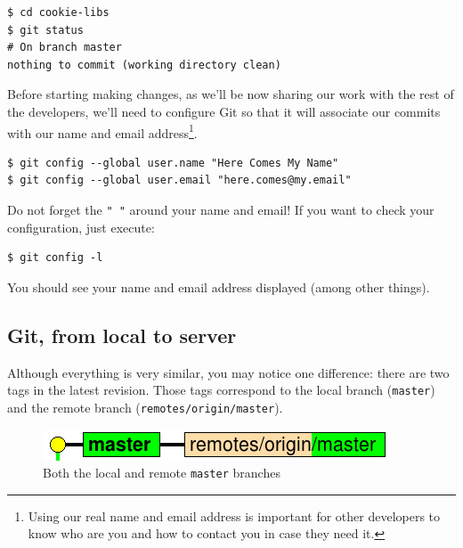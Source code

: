 \documentclass[a4paper,10pt]{article}
\newenvironment{terminal}
  {
    \vspace{+10pt}
    \begin{center}
    \begin{minipage}{0.95\textwidth}
    \begin{framed}
  }
  {
    \end{framed}
    \end{minipage}
    \end{center}
    \vspace{+10pt}
  }
\begin{document}
\begin{terminal}
\begin{verbatim}
$ cd cookie-libs
$ git status
# On branch master
nothing to commit (working directory clean)
\end{verbatim}
\end{terminal}

Before starting making changes, as we'll be now sharing our work with
the rest of the developers, we'll need to configure Git so that it will
associate our commits with our name and email address\footnote{Using
our real name and email address is important for other developers to
know who are you and how to contact you in case they need it.}.

\begin{terminal}
\begin{verbatim}
$ git config --global user.name "Here Comes My Name"
$ git config --global user.email "here.comes@my.email"
\end{verbatim}
\end{terminal}

Do not forget the \texttt{" "} around your name and email! If you want
to check your configuration, just execute:

\begin{terminal}
\begin{verbatim}
$ git config -l
\end{verbatim}
\end{terminal}

You should see your name and email address displayed (among other
things).

\subsection{Git, from local to server}

Although everything is very similar, you may notice one difference:
there are two tags in the latest
revision. Those tags correspond to the local branch (\texttt{master})
and the remote
branch (\texttt{remotes/origin/master}).

\begin{figure}[h]
  \begin{center}
    \includegraphics[scale=0.5]{server-00}
  \end{center}
  \caption{Both the local and remote \texttt{master} branches}
\end{figure}
\end{document}
